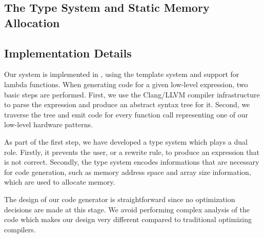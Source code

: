 \subsection{The Type System and Static Memory Allocation}
\label{section:typeSystem}

\subsection{Implementation Details}
Our system is implemented in \Cpp, using the template system and support for lambda functions. 
When generating code for a given low-level expression, two basic steps are performed.
First, we use the Clang/LLVM compiler infrastructure to parse the expression and produce an abstract syntax tree for it.
Second, we traverse the tree and emit code for every function call representing one of our low-level hardware patterns.

As part of the first step, we have developed a type system which plays a dual role.
Firstly, it prevents the user, or a rewrite rule, to produce an expression that is not correct.
Secondly, the type system encodes informations that are necessary for code generation, such as memory address space and array size information, which are used to allocate memory.

The design of our code generator is straightforward since no optimization decisions are made at this stage.
We avoid performing complex analysis of the code which makes our design very different compared to traditional optimizing compilers.

